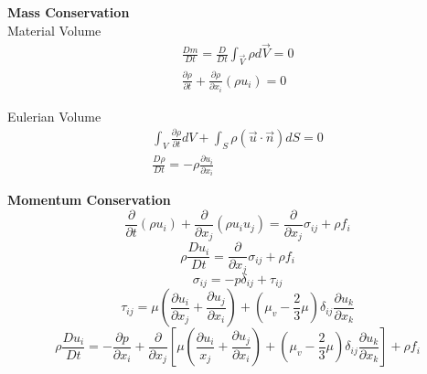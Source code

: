 \documentclass[8pt, landscape, fleqn]{scrartcl}
\begin{document}
\begin{multicols*}{3}
\textbf{Mass Conservation} \\

Material Volume
\begin{align*}
    \frac{Dm}{Dt} = \frac{D}{Dt} \int_{\vec{V}} \rho d\vec{V} = 0 \\
    \frac{\partial \rho}{\partial t} + \frac{\partial \rho}{\partial x_i }(\rho u_i) = 0
\end{align*}

Eulerian Volume
\begin{align*}
    \int_V \frac{\partial \rho}{\partial t} dV + \int_S \rho (\vec{u}\cdot \vec{n}) dS = 0 \\
    \frac{D\rho}{Dt} = -\rho \frac{\partial u_i}{\partial x_i}
\end{align*}

\textbf{Momentum Conservation}
\begin{equation*}
    \frac{\partial}{\partial t} (\rho u_i) + \frac{\partial}{\partial x_j} (\rho u_i u_j) = \frac{\partial}{\partial x_j} \sigma_{ij} + \rho f_i
\end{equation*}
\begin{equation*}
    \rho \frac{D u_i}{Dt} = \frac{\partial}{\partial x_j} \sigma_{ij} + \rho f_i
\end{equation*}
\begin{equation*}
    \sigma_{ij} = -p \delta_{ij} + \tau_{ij}
\end{equation*}
\begin{equation*}
    \tau_{ij} = \mu\left(\frac{\partial u_i}{ \partial x_j} + \frac{\partial u_j}{\partial x_i}\right) + \left( \mu_v - \frac{2}{3} \mu\right) \delta_{ij} \frac{\partial u_k}{\partial x_k}
\end{equation*}
\begin{equation*}
    \rho \frac{D u_i}{D t} = -\frac{\partial p}{\partial x_i} + \frac{\partial}{\partial x_j}\left[\mu \left( \frac{\partial u_i}{x_j} + \frac{\partial u_j}{\partial x_i}\right) + \left( \mu_v - \frac{2}{3}\mu\right) \delta_{ij} \frac{\partial u_k}{\partial x_k}\right] + \rho f_i
\end{equation*}


\end{multicols*}
\end{document}
